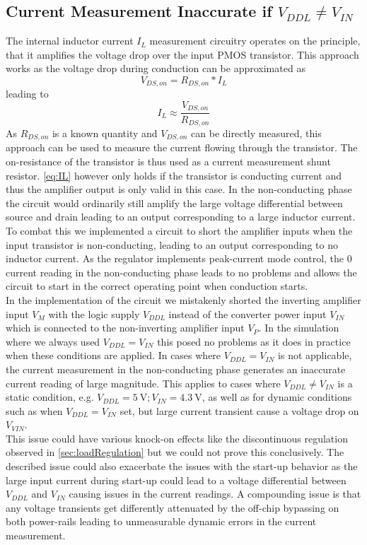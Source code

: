 \subsection{Current Measurement Inaccurate if $V_{DDL} \neq V_{IN}$}
\label{subsubsec:cur_mes_inac}
The internal inductor current $I_L$ measurement circuitry operates on the principle, that it amplifies the voltage drop over the input PMOS transistor. This approach works as the voltage drop during conduction can be approximated as 
\begin{equation}
    V_{DS,on} = R_{DS,on} * I_L
\end{equation}
\label{eq:Vds}
leading to 
\begin{equation}
    I_L \approx \frac{V_{DS,on}}{R_{DS,on}}
\end{equation}
\label{eq:IL}
As $R_{DS,on}$ is a known quantity and $V_{DS,on}$ can be directly measured, this approach can be used to measure the current flowing through the transistor.
The on-resistance of the transistor is thus used as a current measurement shunt resistor. \autoref{eq:IL} however only holds if the transistor is conducting current and thus the amplifier output is only valid in this case. In the non-conducting phase the circuit would ordinarily still amplify the large voltage differential between source and drain leading to an output corresponding to a large inductor current. To combat this we implemented a circuit to short the amplifier inputs when the input transistor is non-conducting, leading to an output corresponding to no inductor current. As the regulator implements peak-current mode control, the 0 current reading in the non-conducting phase leads to no problems and allows the circuit to start in the correct operating point when conduction starts. \\
In the implementation of the circuit we mistakenly shorted the inverting amplifier input $V_M$ with the logic supply $V_{DDL}$ instead of the converter power input $V_{IN}$ which is connected to the non-inverting amplifier input $V_P$. In the simulation where we always used $V_{DDL} = V_{IN}$ this posed no problems as it does in practice when these conditions are applied. In cases where $V_{DDL} = V_{IN}$ is not applicable, the current measurement in the non-conducting phase generates an inaccurate current reading of large magnitude. This applies to cases where $V_{DDL} \neq V_{IN}$ is a static condition, e.g. $V_{DDL} = \qty{5}{\volt}; V_{IN}= \qty{4.3}{\volt}$, as well as for dynamic conditions such as when $V_{DDL} = V_{IN}$ set, but large current transient cause a voltage drop on $V_{VIN}$.\\
This issue could have various knock-on effects like the discontinuous regulation observed in \autoref{sec:loadRegulation} but we could not prove this conclusively. The described issue could also exacerbate the issues with the start-up behavior as the large input current during start-up could lead to a voltage differential between $V_{DDL}$ and $V_{IN}$ causing issues in the current readings. A compounding issue is that any voltage transients get differently attenuated by the off-chip bypassing on both power-rails leading to unmeasurable dynamic errors in the current measurement.

